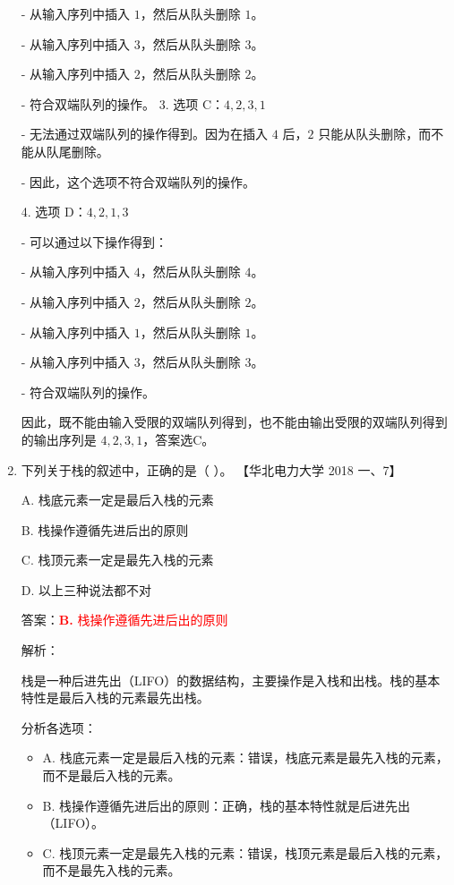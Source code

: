 \documentclass[lang=cn,newtx,10pt,scheme=chinese]{../../../elegantbook}
\begin{document}
\begin{enumerate}
         - 从输入序列中插入 $1$，然后从队头删除 $1$。

         - 从输入序列中插入 $3$，然后从队头删除 $3$。

         - 从输入序列中插入 $2$，然后从队头删除 $2$。

       - 符合双端队列的操作。
    3. 选项 C：$4, 2, 3, 1$

       - 无法通过双端队列的操作得到。因为在插入 $4$ 后，$2$ 只能从队头删除，而不能从队尾删除。

       - 因此，这个选项不符合双端队列的操作。

    4. 选项 D：$4, 2, 1, 3$

       - 可以通过以下操作得到：

         - 从输入序列中插入 $4$，然后从队头删除 $4$。

         - 从输入序列中插入 $2$，然后从队头删除 $2$。

         - 从输入序列中插入 $1$，然后从队头删除 $1$。

         - 从输入序列中插入 $3$，然后从队头删除 $3$。

       - 符合双端队列的操作。

    因此，既不能由输入受限的双端队列得到，也不能由输出受限的双端队列得到的输出序列是 $4, 2, 3, 1$，答案选C。


    \item 下列关于栈的叙述中，正确的是（ ）。  
    【华北电力大学 2018 一、7】  

    A. 栈底元素一定是最后入栈的元素  

    B. 栈操作遵循先进后出的原则  

    C. 栈顶元素一定是最先入栈的元素  

    D. 以上三种说法都不对  

    答案：\textcolor{red}{\textbf{B.} 栈操作遵循先进后出的原则}

    解析：

    栈是一种后进先出（LIFO）的数据结构，主要操作是入栈和出栈。栈的基本特性是最后入栈的元素最先出栈。

    分析各选项：
    \begin{itemize}
        \item A. 栈底元素一定是最后入栈的元素：错误，栈底元素是最先入栈的元素，而不是最后入栈的元素。
        
        \item B. 栈操作遵循先进后出的原则：正确，栈的基本特性就是后进先出（LIFO）。
        
        \item C. 栈顶元素一定是最先入栈的元素：错误，栈顶元素是最后入栈的元素，而不是最先入栈的元素。
        

\end{itemize}
\end{enumerate}
\end{document}

